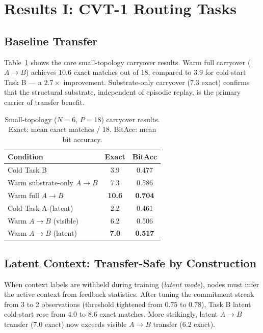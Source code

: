 \documentclass[10pt,twocolumn]{article}
\begin{document}
\section{Results I: CVT-1 Routing Tasks}
\label{sec:cvt1_results}

\subsection{Baseline Transfer}
\label{sec:baseline_transfer}

Table~\ref{tab:transfer_small} shows the core small-topology carryover results.
Warm full carryover ($A \to B$) achieves $10.6$ exact matches out of 18,
compared to $3.9$ for cold-start Task B --- a $2.7\times$ improvement.
Substrate-only carryover ($7.3$ exact) confirms that the structural substrate,
independent of episodic replay, is the primary carrier of transfer benefit.

\begin{table}[t]
\centering
\caption{Small-topology ($N=6$, $P=18$) carryover results.
  Exact: mean exact matches / 18. BitAcc: mean bit accuracy.}
\label{tab:transfer_small}
\small
\begin{tabular}{lcc}
\toprule
Condition & Exact & BitAcc \\
\midrule
Cold Task B                    & 3.9  & 0.477 \\
Warm substrate-only $A\to B$   & 7.3  & 0.586 \\
Warm full $A\to B$             & \textbf{10.6} & \textbf{0.704} \\
\midrule
Cold Task A (latent)           & 2.2  & 0.461 \\
Warm $A\to B$ (visible)        & 6.2  & 0.506 \\
Warm $A\to B$ (latent)         & \textbf{7.0}  & \textbf{0.517} \\
\bottomrule
\end{tabular}
\end{table}

\subsection{Latent Context: Transfer-Safe by Construction}
\label{sec:latent}

When context labels are withheld during training (\emph{latent mode}),
nodes must infer the active context from feedback statistics.
After tuning the commitment streak from 3 to 2 observations
(threshold tightened from $0.75$ to $0.78$), Task B latent cold-start
rose from $4.0$ to $8.6$ exact matches.
More strikingly, latent $A \to B$ transfer ($7.0$ exact) now exceeds
visible $A \to B$ transfer ($6.2$ exact).
\end{document}
